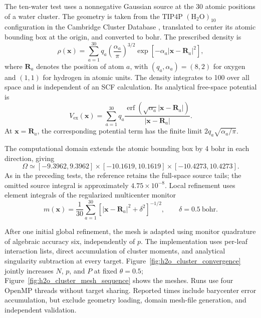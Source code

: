 \documentclass[a4paper,pdflatex,sn-mathphys-num]{sn-jnl}
\theoremstyle{thmstyleone}
\begin{document}
The ten-water test uses a nonnegative Gaussian source at the 30 atomic positions of a water cluster. The geometry is taken from the TIP4P $(\mathrm{H_2O})_{10}$ configuration in the Cambridge Cluster Database \cite{CambridgeTIP4P10,WalesHodges1998}, translated to center its atomic bounding box at the origin, and converted to bohr. The prescribed density is
\begin{equation}
\label{eq:h2o_cluster_density}
\rho(\mathbf x)=\sum_{a=1}^{30}q_a
\left(\dfrac{\alpha_a}{\pi}\right)^{3/2}
\exp\!\left[-\alpha_a|\mathbf x-\mathbf R_a|^2\right],
\end{equation}
where $\mathbf R_a$ denotes the position of atom $a$, with $(q_a,\alpha_a)=(8,2)$ for oxygen and $(1,1)$ for hydrogen in atomic units. The density integrates to 100 over all space and is independent of an SCF calculation. Its analytical free-space potential is
\begin{equation}
\label{eq:h2o_cluster_reference}
V_{\mathrm{ex}}(\mathbf x)=\sum_{a=1}^{30}q_a
\dfrac{\operatorname{erf}(\sqrt{\alpha_a}|\mathbf x-\mathbf R_a|)}
{|\mathbf x-\mathbf R_a|}.
\end{equation}
At $\mathbf x=\mathbf R_a$, the corresponding potential term has the finite limit $2q_a\sqrt{\alpha_a/\pi}$.

The computational domain extends the atomic bounding box by 4 bohr in each direction, giving
\[
\Omega\simeq[-9.3962,9.3962]\times[-10.1619,10.1619]
\times[-10.4273,10.4273].
\]
As in the preceding tests, the reference retains the full-space source tails; the omitted source integral is approximately $4.75\times10^{-8}$. Local refinement uses element integrals of the regularized multicenter monitor
\begin{equation}
\label{eq:h2o_cluster_monitor}
m(\mathbf x)=\dfrac{1}{30}\sum_{a=1}^{30}
\left[|\mathbf x-\mathbf R_a|^2+\delta^2\right]^{-1/2},
\qquad \delta=0.5\ \text{bohr}.
\end{equation}

After one initial global refinement, the mesh is adapted using monitor quadrature of algebraic accuracy six, independently of $p$. The implementation uses per-leaf interaction lists, direct accumulation of cluster moments, and analytical singularity subtraction at every target. Figure~\ref{fig:h2o_cluster_convergence} jointly increases $N$, $p$, and $P$ at fixed $\theta=0.5$; Figure~\ref{fig:h2o_cluster_mesh_sequence} shows the meshes. Runs use four OpenMP threads without target sharing. Reported times include barycenter error accumulation, but exclude geometry loading, domain mesh-file generation, and independent validation.
\end{document}
